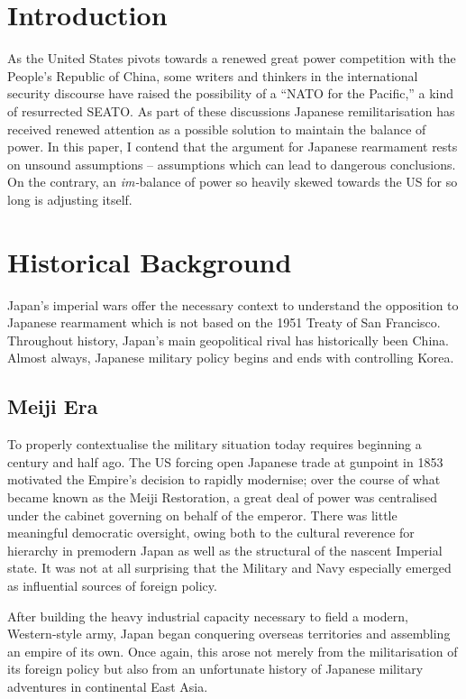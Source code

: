 \documentclass[letterpaper,12pt,twoside]{article} %
\begin{document}
\begin{multicols}{2}

\section*{Introduction}

As the United States pivots towards a renewed great power competition with the People's Republic of China, some writers and thinkers in the international security discourse have raised the possibility of a ``NATO for the Pacific,'' a kind of resurrected SEATO. As part of these discussions Japanese remilitarisation has received renewed attention as a possible solution to maintain the balance of power. In this paper, I contend that the argument for Japanese rearmament rests on unsound assumptions -- assumptions which can lead to dangerous conclusions. On the contrary, an \textit{im-}balance of power so heavily skewed towards the US for so long is adjusting itself.

\section{Historical Background}

  Japan's imperial wars offer the necessary context to understand the opposition to Japanese rearmament which is not based on the 1951 Treaty of San Francisco. Throughout history, Japan's main geopolitical rival has historically been China. Almost always, Japanese military policy begins and ends with controlling Korea.

\subsection{Meiji Era}

  To properly contextualise the military situation today requires beginning a century and half ago. The US forcing open Japanese trade at gunpoint in 1853 motivated the Empire's decision to rapidly modernise; over the course of what became known as the Meiji Restoration, a great deal of power was centralised under the cabinet governing on behalf of the emperor. There was little meaningful democratic oversight, owing both to the cultural reverence for hierarchy in premodern Japan as well as the structural of the nascent Imperial state. It was not at all surprising that the Military and Navy especially emerged as influential sources of foreign policy.

  After building the heavy industrial capacity necessary to field a modern, Western-style army, Japan began conquering overseas territories and assembling an empire of its own. Once again, this arose not merely from the militarisation of its foreign policy but also from an unfortunate history of Japanese military adventures in continental East Asia.


\end{multicols}
\end{document}
